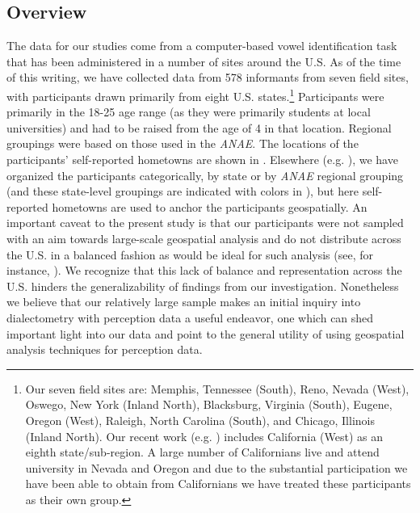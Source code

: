 \documentclass[output=paper]{LSP/langsci}
\begin{document}
\subsection{Overview}
The data for our studies come from a computer-based vowel identification task that has been administered in a number of sites around the U.S. As of the time of this writing, we have collected data from 578 informants from seven field sites, with participants drawn primarily from eight U.S. states.\footnote{Our seven field sites are: Memphis, Tennessee (South), Reno, Nevada (West), Oswego, New York (Inland North), Blacksburg, Virginia (South), Eugene, Oregon (West), Raleigh, North Carolina (South), and Chicago, Illinois (Inland North). Our recent work (e.g. \citealt{kend_frid_inprogress}) includes California (West) as an eighth state/sub-region. A large number of Californians live and attend university in Nevada and Oregon and due to the substantial participation we have been able to obtain from Californians we have treated these participants as their own group.} Participants were primarily in the 18-25 age range (as they were primarily students at local universities) and had to be raised from the age of 4 in that location. Regional groupings were based on those used in the \textit{ANAE}. The locations of the participants’ self-reported hometowns are shown in . Elsewhere (e.g. \citealt{fridland_exploring_2012}), we have organized the participants categorically, by state or by \textit{ANAE} regional grouping (and these state-level groupings are indicated with colors in ), but here self-reported hometowns are used to anchor the participants geospatially. An important caveat to the present study is that our participants were not sampled with an aim towards large-scale geospatial analysis and do not distribute across the U.S. in a balanced fashion as would be ideal for such analysis (see, for instance, \citealt{grieve_corpus-based_2009}). We recognize that this lack of balance and representation across the U.S. hinders the generalizability of findings from our investigation. Nonetheless we believe that our relatively large sample makes an initial inquiry into dialectometry with perception data a useful endeavor, one which can shed important light into our data and point to the general utility of using geospatial analysis techniques for perception data.
\end{document}
